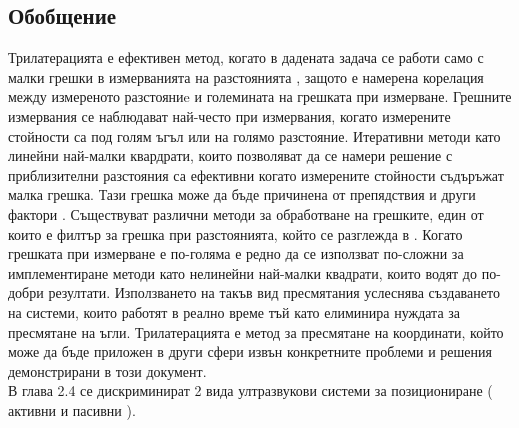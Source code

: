 \subsection{Обобщение}

Трилатерацията е ефективен метод, когато в дадената задача се работи само с малки грешки в измерванията на разстоянията \cite{trilat}, защото е намерена корелация между измереното разстояниe и големината на грешката при измерване. Грешните измервания се наблюдават най-често при измервания, когато измерените стойности са под голям ъгъл или на голямо разстояние. Итеративни методи като линейни най-малки квардрати, които позволяват да се намери решение с приблизителни разстояния са ефективни когато измерените стойности съдъръжат малка грешка. Тази грешка може да бъде причинена от препядствия и други фактори \cite{yonei}. Съществуват различни методи за обработване на грешките, един от които е филтър за грешка при разстоянията, който се разглежда в \cite{yonei}. Когато грешката при измерване е по-голяма е редно да се използват по-сложни за имплементиране методи като нелинейни най-малки квадрати, които водят до по-добри резултати. Използването на такъв вид пресмятания услеснява създаването на системи, които работят в реално време тъй като елиминира нуждата за пресмятане на ъгли. Трилатерацията е метод за пресмятане на координати, който може да бъде приложен в други сфери извън конкретните проблеми и решения демонстрирани в този документ. \\В глава 2.4 се дискриминират 2 вида ултразвукови системи за позициониране ( активни и пасивни ).